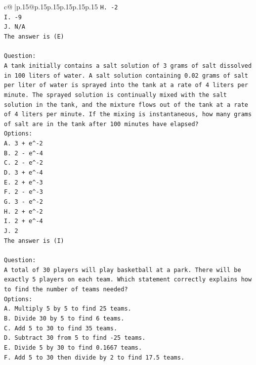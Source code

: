 \documentclass{article}
\begin{document}
{\begin{supertabular}{c@{$\;$}|p{.15\linewidth}@{}p{.15\linewidth}p{.15\linewidth}p{.15\linewidth}p{.15\linewidth}p{.15\linewidth}}
{{{\texttt{H. {-}2} \\
\texttt{I. {-}9} \\
\texttt{J. N/A} \\
\texttt{The answer is (E)} \\
\\ 
\texttt{Question:} \\
\texttt{A tank initially contains a salt solution of 3 grams of salt dissolved in 100 liters of water. A salt solution containing 0.02 grams of salt per liter of water is sprayed into the tank at a rate of 4 liters per minute. The sprayed solution is continually mixed with the salt solution in the tank, and the mixture flows out of the tank at a rate of 4 liters per minute. If the mixing is instantaneous, how many grams of salt are in the tank after 100 minutes have elapsed?} \\
\texttt{Options:} \\
\texttt{A. 3 + e\^{}{-}2} \\
\texttt{B. 2 {-} e\^{}{-}4} \\
\texttt{C. 2 {-} e\^{}{-}2} \\
\texttt{D. 3 + e\^{}{-}4} \\
\texttt{E. 2 + e\^{}{-}3} \\
\texttt{F. 2 {-} e\^{}{-}3} \\
\texttt{G. 3 {-} e\^{}{-}2} \\
\texttt{H. 2 + e\^{}{-}2} \\
\texttt{I. 2 + e\^{}{-}4} \\
\texttt{J. 2} \\
\texttt{The answer is (I)} \\
\\ 
\texttt{Question:} \\
\texttt{A total of 30 players will play basketball at a park. There will be exactly 5 players on each team. Which statement correctly explains how to find the number of teams needed?} \\
\texttt{Options:} \\
\texttt{A. Multiply 5 by 5 to find 25 teams.} \\
\texttt{B. Divide 30 by 5 to find 6 teams.} \\
\texttt{C. Add 5 to 30 to find 35 teams.} \\
\texttt{D. Subtract 30 from 5 to find {-}25 teams.} \\
\texttt{E. Divide 5 by 30 to find 0.1667 teams.} \\
\texttt{F. Add 5 to 30 then divide by 2 to find 17.5 teams.} \\
}}}
\end{supertabular}}
\end{document}
